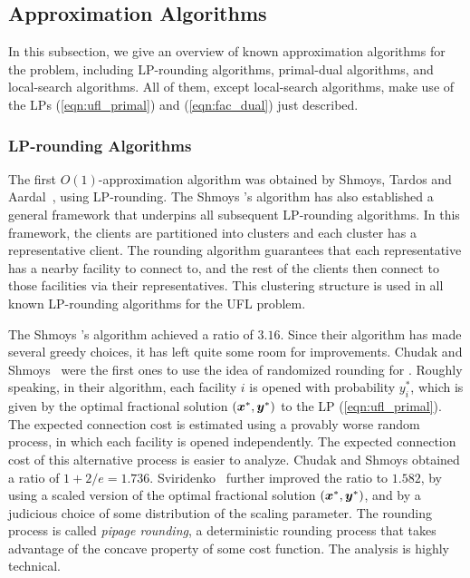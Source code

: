 \documentclass[oneside,final]{ucr}
\begin{document}
\subsection{Approximation Algorithms}
In this subsection, we give an overview of known
approximation algorithms for the {\UFL} problem, including
LP-rounding algorithms, primal-dual algorithms, and
local-search algorithms. All of them, except local-search
algorithms, make use of the LPs (\ref{eqn:ufl_primal}) and
(\ref{eqn:fac_dual}) just described.

\subsubsection{LP-rounding Algorithms}
The first $O(1)$-approximation algorithm was obtained by
Shmoys, Tardos and Aardal~\cite{ShmoysTA97}, using
LP-rounding. The Shmoys {\etal}'s algorithm has also
established a general framework that underpins all
subsequent LP-rounding algorithms. In this framework, the
clients are partitioned into clusters and each cluster has a
representative client. The rounding algorithm guarantees
that each representative has a nearby facility to connect
to, and the rest of the clients then connect to those
facilities via their representatives. This clustering
structure is used in all known LP-rounding algorithms for
the UFL problem.

The Shmoys {\etal}'s algorithm achieved a ratio of
$3.16$. Since their algorithm has made several greedy
choices, it has left quite some room for
improvements. Chudak and Shmoys~\cite{ChudakS04} were the
first ones to use the idea of randomized rounding for
{\UFL}. Roughly speaking, in their algorithm, each facility
$i$ is opened with probability $y_i^\ast$, which is given by
the optimal fractional solution $(\boldsymbol{x}^\ast,\boldsymbol{y}^\ast)$ to
the LP (\ref{eqn:ufl_primal}). The expected connection cost
is estimated using a provably worse random process, in which
each facility is opened independently. The expected
connection cost of this alternative process is easier to
analyze. Chudak and Shmoys obtained a ratio of $1+2/e =
1.736$. Sviridenko~\cite{Svi02} further improved the ratio
to $1.582$, by using a scaled version of the optimal
fractional solution $(\boldsymbol{x}^\ast,\boldsymbol{y}^\ast)$, and by a
judicious choice of some distribution of the scaling
parameter. The rounding process is called \emph{pipage
  rounding}, a deterministic rounding process that takes
advantage of the concave property of some cost function. The
analysis is highly technical.
\end{document}
